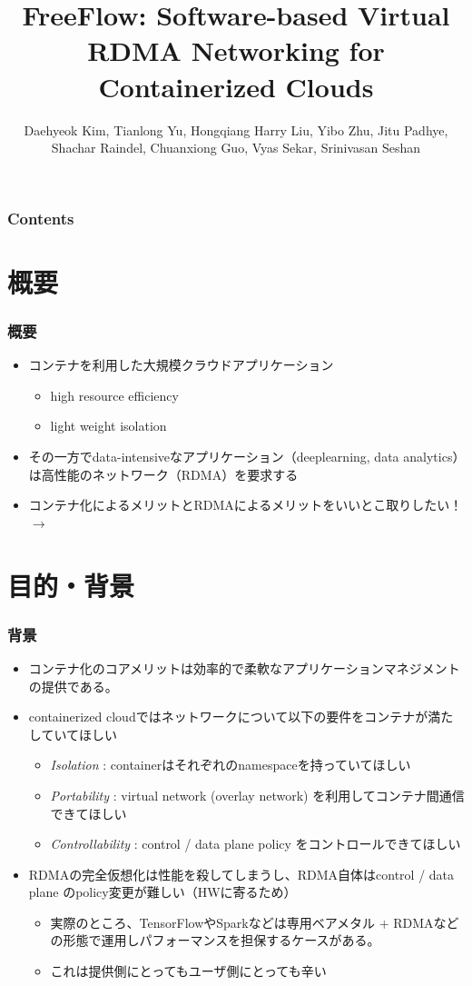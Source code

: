 \documentclass[dvipdfmx,9pt,notheorems]{beamer}
\title{FreeFlow: Software-based Virtual RDMA Networking for Containerized Clouds}
\author{Daehyeok Kim\footnotemark[1], Tianlong Yu\footnotemark[1], Hongqiang Harry Liu\footnotemark[3], Yibo Zhu\footnotemark[2], Jitu Padhye\footnotemark[2], Shachar Raindel\footnotemark[2], Chuanxiong Guo\footnotemark[4], Vyas Sekar\footnotemark[1], Srinivasan Seshan\footnotemark[1]}
\institute{\footnotemark[1]Carnegie Mellon University, \footnotemark[2]Microsoft, \footnotemark[3]Alibaba, \footnotemark[4]Bytedance}
\theoremstyle{definition}
\begin{document}
\begin{frame}[plain]\frametitle{}
\titlepage %
\end{frame}

\begin{frame}\frametitle{Contents}
\raggedright
\tableofcontents
\end{frame}

\section{概要}
\begin{frame}\frametitle{概要}
\begin{itemize}
  \item コンテナを利用した大規模クラウドアプリケーション
  	\begin{itemize}
  		\item high resource efficiency
  		\item	light weight isolation
  	\end{itemize}
	\item その一方でdata-intensiveなアプリケーション（deeplearning, data analytics）は高性能のネットワーク（RDMA）を要求する
	\item コンテナ化によるメリットとRDMAによるメリットをいいとこ取りしたい！ $\rightarrow$ 
\end{itemize}
\end{frame}
\section{目的・背景}
\begin{frame}\frametitle{背景}
\begin{itemize}
  \item コンテナ化のコアメリットは効率的で柔軟なアプリケーションマネジメントの提供である。
	\item containerized cloudではネットワークについて以下の要件をコンテナが満たしていてほしい
	\begin{itemize}
		\item \textit{{\color{red} Isolation}} : containerはそれぞれのnamespaceを持っていてほしい
		\item \textit{{\color{red} Portability}} : virtual network (overlay network) を利用してコンテナ間通信できてほしい
		\item \textit{{\color{red} Controllability}} : control / data plane policy をコントロールできてほしい
	\end{itemize}
  \item RDMAの完全仮想化は性能を殺してしまうし、RDMA自体はcontrol / data plane のpolicy変更が難しい（HWに寄るため）
	\begin{itemize}
		\item 実際のところ、TensorFlowやSparkなどは専用ベアメタル + RDMAなどの形態で運用しパフォーマンスを担保するケースがある。
		\item これは提供側にとってもユーザ側にとっても辛い
	\end{itemize}
\end{itemize}
\end{frame}
\end{document}
